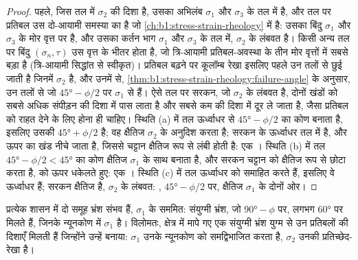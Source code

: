 \begin{proof}
पहले, जिस तल में $\sigma_2$ की दिशा है, उसका अभिलंब $\sigma_1$ और $\sigma_3$ के तल में है, और तल पर प्रतिबल उस दो-आयामी समस्या का है जो \cref{ch:b1:stress-strain-rheology} में है: उसका बिंदु $\sigma_1$ और $\sigma_3$ के मोर वृत्त पर है, और उसका कर्तन भाग $\sigma_1$ और $\sigma_3$ के तल में, $\sigma_2$ के लंबवत है। किसी अन्य तल पर बिंदु $(\sigma_n, \tau)$ उस वृत्त के भीतर होता है, जो त्रि-आयामी प्रतिबल-अवस्था के तीन मोर वृत्तों में सबसे बड़ा है (त्रि-आयामी सिद्धांत से स्वीकृत)। प्रतिबल बढ़ने पर कूलॉम्ब रेखा इसलिए पहले उन तलों से छुई जाती है जिनमें $\sigma_2$ है, और उनमें से, \cref{thm:b1:stress-strain-rheology:failure-angle} के अनुसार, उन तलों से जो $\ang{45} - \phi/2$ पर $\sigma_1$ से हैं। ऐसे तल पर सरकन, जो $\sigma_2$ के लंबवत है, दोनों खंडों को सबसे अधिक संपीड़न की दिशा में पास लाता है और सबसे कम की दिशा में दूर ले जाता है, जैसा प्रतिबल को राहत देने के लिए होना ही चाहिए। स्थिति (a) में तल ऊर्ध्वाधर से $\ang{45} - \phi/2$ का कोण बनाता है, इसलिए उसकी  $\ang{45} + \phi/2$ है; वह क्षैतिज $\sigma_2$ के अनुदिश  करता है; सरकन  के ऊर्ध्वाधर तल में है, और ऊपर का खंड नीचे जाता है, जिससे चट्टान क्षैतिज रूप से लंबी होती है: एक । स्थिति (b) में तल $\ang{45} - \phi/2 < \ang{45}$ का कोण क्षैतिज $\sigma_1$ के साथ बनाता है, और सरकन चट्टान को क्षैतिज रूप से छोटा करता है,  को ऊपर धकेलते हुए: एक । स्थिति (c) में तल ऊर्ध्वाधर को समाहित करते हैं, इसलिए वे ऊर्ध्वाधर हैं; सरकन क्षैतिज है, $\sigma_2$ के लंबवत: , $\ang{45} - \phi/2$ पर, क्षैतिज $\sigma_1$ के दोनों ओर।
\end{proof}

प्रत्येक शासन में दो समूह भ्रंश संभव हैं, $\sigma_1$ के सममित: संयुग्मी भ्रंश, जो $\ang{90} - \phi$ पर, लगभग \ang{60} पर मिलते हैं, जिनके न्यूनकोण में $\sigma_1$ है। विलोमतः, क्षेत्र में मापे गए एक संयुग्मी भ्रंश युग्म से उन प्रतिबलों की दिशाएँ मिलती हैं जिन्होंने उन्हें बनाया: $\sigma_1$ उनके न्यूनकोण को समद्विभाजित करता है, $\sigma_2$ उनकी प्रतिच्छेद-रेखा है।

